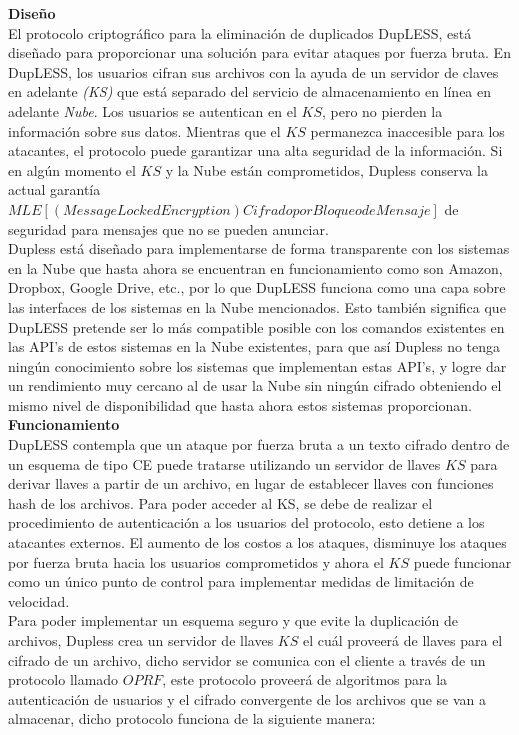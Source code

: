 \textbf{Diseño} \\

El protocolo criptográfico para la eliminación de duplicados DupLESS, está diseñado para proporcionar una solución para evitar ataques por fuerza bruta. En DupLESS, los usuarios cifran sus archivos con la ayuda de un servidor de claves en adelante \textit{(KS)} que está separado del servicio de almacenamiento en línea en adelante \textit{Nube}. Los usuarios se autentican en el $KS$, pero no pierden la información sobre sus datos. Mientras que el $KS$ permanezca inaccesible para los atacantes, el protocolo puede garantizar una alta seguridad de la información. Si en algún momento el $KS$ y la Nube están comprometidos, Dupless conserva la actual garantía $MLE[(Message Locked Encryption) Cifrado por Bloqueo de Mensaje]$ de seguridad para mensajes que no se pueden anunciar.\\ 

Dupless está diseñado para implementarse de forma transparente con los sistemas en la Nube que hasta ahora se encuentran en funcionamiento como son Amazon, Dropbox, Google Drive, etc., por lo que DupLESS funciona como una capa sobre las interfaces de los sistemas en la Nube mencionados. Esto también significa que DupLESS pretende ser lo más compatible posible con los comandos existentes en las API's de estos sistemas en la Nube existentes, para que así Dupless no tenga ningún conocimiento sobre los sistemas que implementan estas API's, y logre dar un rendimiento muy cercano al de usar la Nube sin ningún cifrado obteniendo el mismo nivel de disponibilidad que hasta ahora estos sistemas proporcionan. \\


\textbf{Funcionamiento}\\

DupLESS contempla que un ataque por fuerza bruta a un texto cifrado dentro de un esquema de tipo CE puede tratarse utilizando un servidor de llaves $KS$ para derivar llaves a partir de un archivo, en lugar de establecer llaves con funciones hash de los archivos. Para poder acceder al KS, se debe de realizar el procedimiento de autenticación a los usuarios del protocolo, esto detiene a los atacantes externos. El aumento de los costos a los ataques, disminuye los ataques por fuerza bruta hacia los usuarios comprometidos y ahora el $KS$ puede funcionar como un único punto de control para implementar medidas de limitación de velocidad. \\

Para poder implementar un esquema seguro y que evite la duplicación de archivos, Dupless crea un servidor de llaves $KS$ el cuál proveerá de llaves para el cifrado de un archivo, dicho servidor se comunica con el cliente a través de un protocolo llamado $OPRF$, este protocolo proveerá de algoritmos para la autenticación de usuarios y el cifrado convergente de los archivos que se van a almacenar, dicho protocolo funciona de la siguiente manera: \\ 

